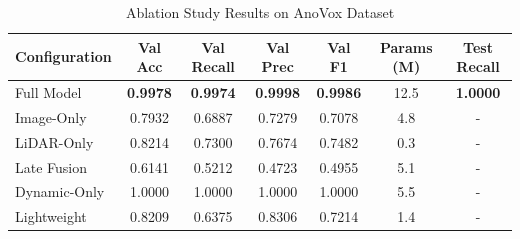\begin{table}[h]
\centering
\caption{Ablation Study Results on AnoVox Dataset}
\label{tab:ablation}
\begin{tabular}{lcccccc}
\hline
\textbf{Configuration} & \textbf{Val Acc} & \textbf{Val Recall} & \textbf{Val Prec} & \textbf{Val F1} & \textbf{Params (M)} & \textbf{Test Recall} \\
\hline
Full Model & \textbf{0.9978} & \textbf{0.9974} & \textbf{0.9998} & \textbf{0.9986} & 12.5 & \textbf{1.0000} \\
Image-Only & 0.7932 & 0.6887 & 0.7279 & 0.7078 & 4.8 & - \\
LiDAR-Only & 0.8214 & 0.7300 & 0.7674 & 0.7482 & 0.3 & - \\
Late Fusion & 0.6141 & 0.5212 & 0.4723 & 0.4955 & 5.1 & - \\
Dynamic-Only & 1.0000 & 1.0000 & 1.0000 & 1.0000 & 5.5 & - \\
Lightweight & 0.8209 & 0.6375 & 0.8306 & 0.7214 & 1.4 & - \\
\hline
\end{tabular}
\end{table}
